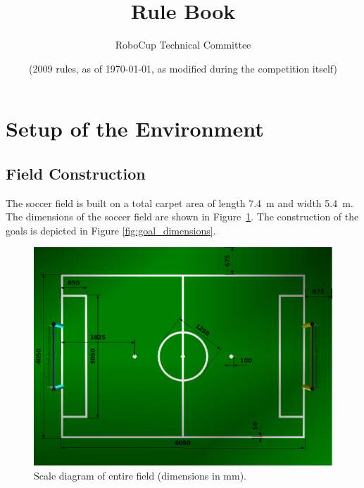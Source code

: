\documentclass[12pt]{article}
\title{\leaguename Rule Book}
\author{RoboCup Technical Committee}
\date{(2009 rules, as of \today, as modified during the competition itself)}
\newcommand{\TotalWidth}{5.4~m\xspace}
\newcommand{\TotalLength}{7.4~m\xspace }
\begin{document}
\maketitle

\vfill

\tableofcontents
\setcounter{tocdepth}{3}

\thispagestyle{fancy}

\clearpage

\cfoot{\thepage}
\setcounter{page}{1}

\section{Setup of the Environment}

\subsection{Field Construction}

The soccer field is built on a total carpet area of length \TotalLength and width \TotalWidth. The dimensions of the soccer field are shown in Figure~\ref{fig:field_dim}. The construction of the goals is depicted in Figure \ref{fig:goal_dimensions}.

\begin{figure}[b!]
\centerline{\includegraphics[width=\columnwidth]{figs/fieldDimensions2009.png}}
\caption{Scale diagram of entire field (dimensions in mm).} \label{fig:field_dim}
\end{figure}
\end{document}
